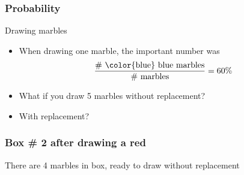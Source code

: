 \documentclass[handout]{beamer}
\begin{document}

   \begin{frame} \frametitle{Probability}

   \begin{block}
   {Drawing marbles}
   \begin{itemize}
     \item When drawing one marble, the important number was
     $$
     \frac{\# \ \text{{\color{blue} blue marbles}}}{\# \ \text{marbles}} = 60\%
     $$
     \item What if you draw 5 marbles without replacement?
     \item With replacement?
   \end{itemize}
   \end{block}
   \end{frame}



   \begin{frame}
   \frametitle{Box \# 2 after drawing a red}
   \begin{center}
   \end{center}
   There are 4 marbles in box, ready to draw without replacement
   \end{frame}

\end{document}
